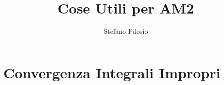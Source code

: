 \documentclass[a4paper]{article}
\theoremstyle{plain}
\begin{document}
\author{Stefano Pilosio}
\title {Cose Utili per AM2}
\maketitle



\section{Convergenza Integrali Impropri}
\end{document}

